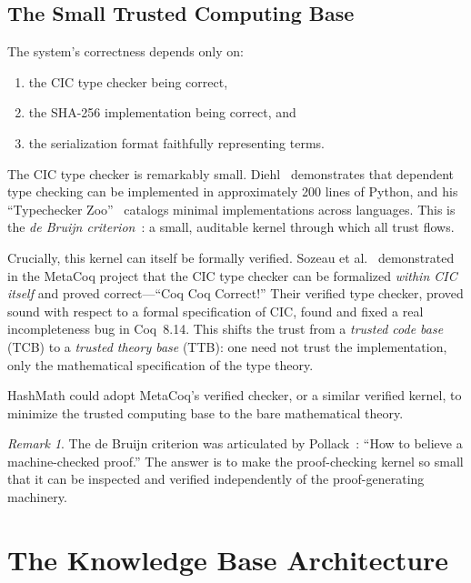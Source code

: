 \documentclass[11pt]{article}
\theoremstyle{definition}
\theoremstyle{plain}
\theoremstyle{remark}
\newtheorem{remark}{Remark}[section]
\begin{document}
\subsection{The Small Trusted Computing Base}
\label{sec:tcb}

The system's correctness depends only on:
\begin{enumerate}[nosep]
  \item the CIC type checker being correct,
  \item the SHA-256 implementation being correct, and
  \item the serialization format faithfully representing terms.
\end{enumerate}

The CIC type checker is remarkably small.
Diehl~\cite{diehl200lines} demonstrates that dependent type checking can be implemented in
approximately 200 lines of Python, and his ``Typechecker Zoo''~\cite{diehlzoo} catalogs
minimal implementations across languages.
This is the \emph{de Bruijn criterion}~\cite{debruijn1970}: a small, auditable kernel through
which all trust flows.

Crucially, this kernel can itself be formally verified.
Sozeau et al.~\cite{metacoq} demonstrated in the MetaCoq project that the CIC type checker
can be formalized \emph{within CIC itself} and proved correct---``Coq Coq Correct!''
Their verified type checker, proved sound with respect to a formal specification of CIC,
found and fixed a real incompleteness bug in Coq~8.14.
This shifts the trust from a \emph{trusted code base} (TCB) to a \emph{trusted theory base} (TTB):
one need not trust the implementation, only the mathematical specification of the type theory.

HashMath could adopt MetaCoq's verified checker, or a similar verified kernel, to minimize
the trusted computing base to the bare mathematical theory.

\begin{remark}
The de Bruijn criterion was articulated by Pollack~\cite{pollack1998}: ``How to believe a
machine-checked proof.''
The answer is to make the proof-checking kernel so small that it can be inspected and verified
independently of the proof-generating machinery.
\end{remark}


\section{The Knowledge Base Architecture}
\label{sec:architecture}
\end{document}
